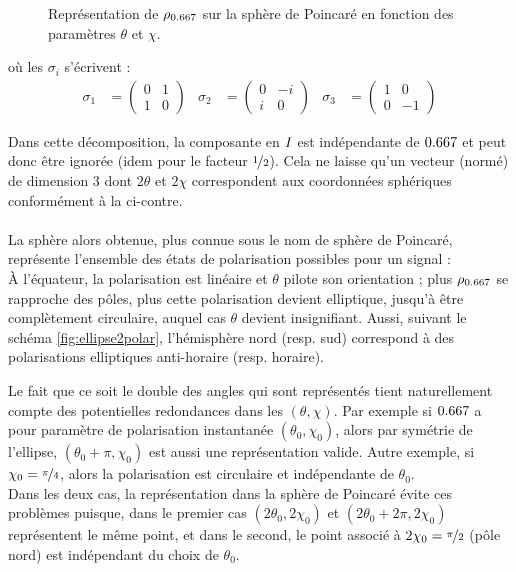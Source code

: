 \begin{figure}
	
	\caption[ Projection sur la sphère de Poincaré]{Représentation de $\rho_{\x}$ sur la sphère de Poincaré en fonction des paramètres $\theta$ et $\chi$.}
	\label{fig:sphere2poincare}
\end{figure}

\par \noindent
où les $\sigma_i$ s'écrivent :
\begin{align*}
	\sigma_1 &= \begin{pmatrix} 0 & 1 \\ 1 &  0 \end{pmatrix}  &
	\sigma_2 &= \begin{pmatrix} 0 & -i \\  i &  0 \end{pmatrix}  &
	\sigma_3 &= \begin{pmatrix} 1 & 0 \\ 0 & -1 \end{pmatrix}
\end{align*}
\skipl

Dans cette décomposition, la composante en $I_{}$ est indépendante de $\x$ et peut donc être ignorée (idem pour le facteur $\nicefrac{1}{2}$). Cela ne laisse qu'un vecteur (normé) de dimension 3 dont $2\theta$ et $2\chi$ correspondent aux coordonnées sphériques conformément à la  ci-contre.
\\ 
\\
La sphère alors obtenue, plus connue sous le nom de sphère de Poincaré, représente l'ensemble des états de polarisation possibles pour un signal :
\\
À l'équateur, la polarisation est linéaire et $\theta$ pilote son orientation ; plus $\rho_{\x}$ se rapproche des pôles, plus cette polarisation devient elliptique, jusqu'à être complètement circulaire, auquel cas $\theta$ devient insignifiant. 
Aussi, suivant le schéma \cref{fig:ellipse2polar}, l'hémisphère nord (resp. sud) correspond à des polarisations elliptiques anti-horaire (resp. horaire).

Le fait que ce soit le double des angles qui sont représentés tient naturellement compte des potentielles redondances dans les $(\theta,\chi)$. 
Par exemple si $\x$ a pour paramètre de polarisation instantanée $(\theta_0, \chi_0)$, alors par symétrie de l'ellipse, $(\theta_0+\pi, \chi_0)$ est aussi une représentation valide. Autre exemple, si $\chi_0 = \nicefrac{\pi}{4}$, alors la polarisation est circulaire et indépendante de $\theta_0$.
\\
Dans les deux cas, la représentation dans la sphère de Poincaré évite ces problèmes puisque, dans le premier cas $(2\theta_0, 2\chi_0)$ et $(2\theta_0+2\pi, 2\chi_0)$ représentent le même point, et dans le second, le point associé à $2\chi_0=\nicefrac{\pi}{2}$ (pôle nord) est indépendant du choix de $\theta_0$.

